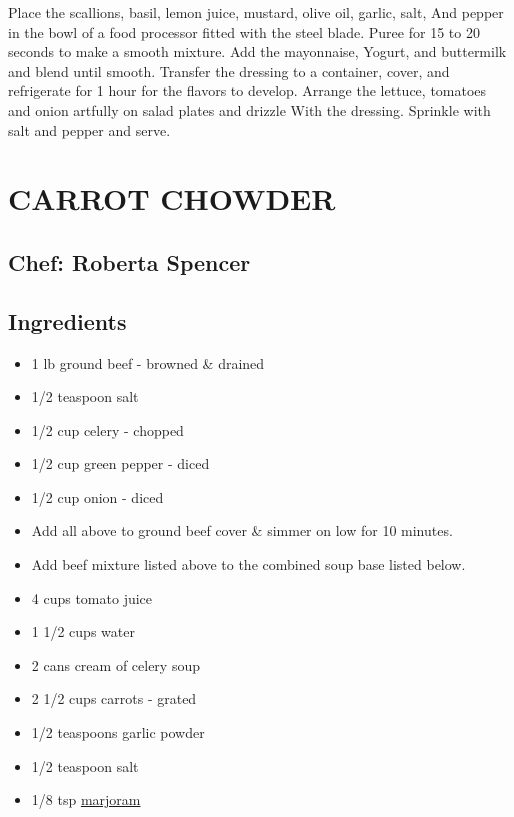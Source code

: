 \documentclass[
]{book}
\providecommand{\tightlist}{%
  \setlength{\itemsep}{0pt}\setlength{\parskip}{0pt}}
\begin{document}
Place the scallions, basil, lemon juice, mustard, olive oil, garlic, salt,
And pepper in the bowl of a food processor fitted with the steel blade.
Puree for 15 to 20 seconds to make a smooth mixture. Add the mayonnaise,
Yogurt, and buttermilk and blend until smooth. Transfer the dressing to a
container, cover, and refrigerate for 1 hour for the flavors to develop.
Arrange the lettuce, tomatoes and onion artfully on salad plates and drizzle
With the dressing. Sprinkle with salt and pepper and serve.

\hypertarget{carrot-chowder}{%
\section*{CARROT CHOWDER}\label{carrot-chowder}}


\hypertarget{chef-roberta-spencer-2}{%
\subsection*{Chef: Roberta Spencer}\label{chef-roberta-spencer-2}}


\hypertarget{ingredients-17}{%
\subsection*{Ingredients}\label{ingredients-17}}


\begin{itemize}
\tightlist
\item
  1 lb ground beef - browned \& drained
\item
  1/2 teaspoon salt
\item
  1/2 cup celery - chopped
\item
  1/2 cup green pepper - diced
\item
  1/2 cup onion - diced
\item
  Add all above to ground beef cover \& simmer on low for 10 minutes.
\item
  Add beef mixture listed above to the combined soup base listed below.
\item
  4 cups tomato juice
\item
  1 1/2 cups water
\item
  2 cans cream of celery soup
\item
  2 1/2 cups carrots - grated
\item
  1/2 teaspoons garlic powder
\item
  1/2 teaspoon salt
\item
  1/8 tsp \href{https://en.wikipedia.org/wiki/Marjoram}{marjoram}
\end{itemize}
\end{document}
